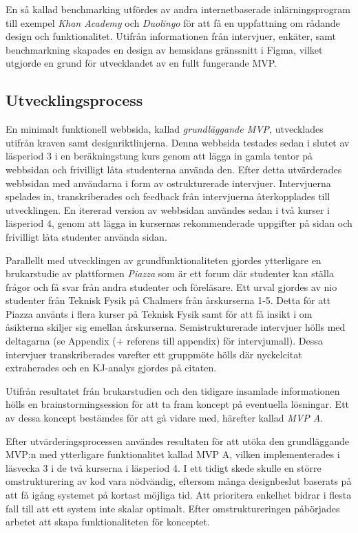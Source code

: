 En så kallad benchmarking utfördes av andra internetbaserade inlärningsprogram till exempel \emph{Khan Academy} och \emph{Duolingo} för att få en uppfattning om rådande design och funktionalitet. Utifrån informationen från intervjuer, enkäter, samt benchmarkning skapades en design av hemsidans gränssnitt i Figma, vilket utgjorde en grund för utvecklandet av en fullt fungerande MVP.

\subsection{Utvecklingsprocess}
En minimalt funktionell webbsida, kallad \emph{grundläggande MVP}, utvecklades utifrån kraven samt designriktlinjerna. Denna webbsida testades sedan i slutet av läsperiod 3 i en beräkningstung kurs genom att lägga in gamla tentor på webbsidan och frivilligt låta studenterna använda den. Efter detta utvärderades webbsidan med användarna i form av ostrukturerade intervjuer. Intervjuerna spelades in, transkriberades och feedback från intervjuerna återkopplades till utvecklingen. En itererad version av webbsidan användes sedan i två kurser i läsperiod 4, genom att lägga in kursernas rekommenderade uppgifter på sidan och frivilligt låta studenter använda sidan. 

Parallellt med utvecklingen av grundfunktionaliteten gjordes ytterligare en brukarstudie av plattformen \emph{Piazza} som är ett forum där studenter kan ställa frågor och få svar från andra studenter och föreläsare. Ett urval gjordes av nio studenter från Teknisk Fysik på Chalmers från årskurserna 1-5. Detta för att Piazza använts i flera kurser på Teknisk Fysik samt för att få insikt i om åsikterna skiljer sig emellan årskurserna. Semistrukturerade intervjuer hölls med deltagarna (se Appendix (+ referens till appendix) för intervjumall). Dessa intervjuer transkriberades varefter ett gruppmöte hölls där nyckelcitat extraherades och en KJ-analys gjordes på citaten. 

Utifrån resultatet från brukarstudien och den tidigare insamlade informationen hölls en brainstormingsession för att ta fram koncept på eventuella lösningar. Ett av dessa koncept bestämdes för att gå vidare med, härefter kallad \emph{MVP A}. 




Efter utvärderingsprocessen användes resultaten för att utöka den grundläggande MVP:n med ytterligare funktionalitet kallad  MVP A, vilken implementerades i läsvecka 3 i de två kurserna i läsperiod 4. I ett tidigt skede skulle en större omstrukturering av kod vara nödvändig, eftersom många designbeslut baserats på att få igång systemet på kortast möjliga tid. Att prioritera enkelhet bidrar i flesta fall till att ett system inte skalar optimalt. Efter omstruktureringen påbörjades arbetet att skapa funktionaliteten för konceptet.  

